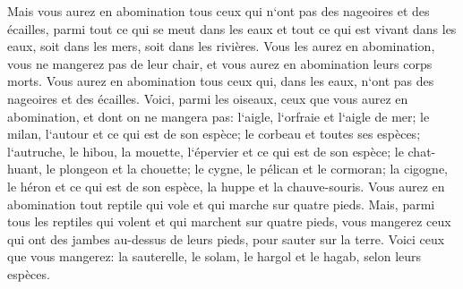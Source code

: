 \verse Mais vous aurez en abomination tous ceux qui n`ont pas des nageoires et des écailles, parmi tout ce qui se meut dans les eaux et tout ce qui est vivant dans les eaux, soit dans les mers, soit dans les rivières. 
\verse Vous les aurez en abomination, vous ne mangerez pas de leur chair, et vous aurez en abomination leurs corps morts. 
\verse Vous aurez en abomination tous ceux qui, dans les eaux, n`ont pas des nageoires et des écailles. 
\verse Voici, parmi les oiseaux, ceux que vous aurez en abomination, et dont on ne mangera pas: l`aigle, l`orfraie et l`aigle de mer; 
\verse le milan, l`autour et ce qui est de son espèce; 
\verse le corbeau et toutes ses espèces; 
\verse l`autruche, le hibou, la mouette, l`épervier et ce qui est de son espèce; 
\verse le chat-huant, le plongeon et la chouette; 
\verse le cygne, le pélican et le cormoran; 
\verse la cigogne, le héron et ce qui est de son espèce, la huppe et la chauve-souris. 
\verse Vous aurez en abomination tout reptile qui vole et qui marche sur quatre pieds. 
\verse Mais, parmi tous les reptiles qui volent et qui marchent sur quatre pieds, vous mangerez ceux qui ont des jambes au-dessus de leurs pieds, pour sauter sur la terre. 
\verse Voici ceux que vous mangerez: la sauterelle, le solam, le hargol et le hagab, selon leurs espèces. 
